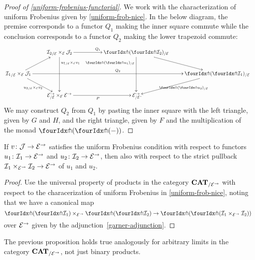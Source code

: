 \documentclass[reqno,10pt,a4paper,oneside,draft]{amsart}
\begin{document}
\begin{proof}[Proof of \cref{uniform-frobenius-functorial}]
We work with the characterization of uniform Frobenius given by \cref{uniform-frob-nice}.
In the below diagram, the premise corresponds to a functor $Q_1$ making the inner square commute while the conclusion corresponds to a functor $Q_2$ making the lower trapezoid commute:
\[
\xymatrix{
&
  {\cal{I}_2}_{/\cal{E}} \times_{\cal{E}} \cal{J}_2
  \ar[rr]^{Q_1}
  \ar[dd]^(0.25){{u_1}_{/\cal{E}} \times_{\cal{E}} v_1}
&&
  \liftl{(\liftr{\cal{I}_2})}_{/\cal{E}}
  \ar[dr]
  \ar[dd]_(0.25){\liftl{(\liftr{u_1})}_{/\cal{E}}}
\\
  {\cal{I}_1}_{/\cal{E}} \times_{\cal{E}} \cal{J}_1
  \ar[ur]
  \ar[dr]_{{u_2}_{/\cal{E}} \times_{\cal{E}} v_2}
  \ar[rrrr]^{Q_2}
&&&&
  \liftl{(\liftr{\cal{I}_1})}_{/\cal{E}}
  \ar[dl]^{\liftl{(\liftr{u_2})}_{/\cal{E}}}
\\&
  \cal{E}^\to_{/\cal{E}} \times_{\cal{E}} \cal{E}^\to
  \ar[rr]_{P}
&&
  \cal{E}^\to_{/\cal{E}}
\rlap{.}}
\]
We may construct $Q_2$ from $Q_1$ by pasting the inner square with the left triangle, given by $G$ and $H$, and the right triangle, given by $F$ and the multiplication of the monad $\liftl{(\liftr{(-)})}$.
\end{proof}

\begin{proposition} \label{uniform-frobenius-product-u}
If $v \co \cal{J} \to \cal{E}^\to$ satisfies the uniform Frobenius condition with respect to functors $u_1 \co \cal{I}_1 \to \cal{E}^\to$ and $u_2 \co \cal{I}_2 \to \cal{E}^\to$, then also with respect to the strict pullback $\cal{I}_1 \times_{\cal{E}^\to} \cal{I}_2 \to \cal{E}^\to$ of $u_1$ and $u_2$.
\end{proposition}

\begin{proof}
Use the universal property of products in the category $\CAT_{/\cal{E}^\to}$ with respect to the characerization of uniform Frobenius in \cref{uniform-frob-nice}, noting that we have a canonical map
\[
\liftl{(\liftr{\cal{I}_1})} \times_{\cal{E}^\to} \liftl{(\liftr{\cal{I}_2})} \to \liftl{(\liftr{(\cal{I}_1 \times_{\cal{E}^\to} \cal{I}_2)})}
\]
over $\cal{E}^\to$ given by the adjunction~\eqref{garner-adjunction}.
\end{proof}

\begin{remark} \label{uniform-frobenius-limit-u}
The previous proposition holds true analogously for arbitrary limits in the category $\CAT_{/\cal{E}^\to}$, not just binary products.
\end{remark}
\end{document}
